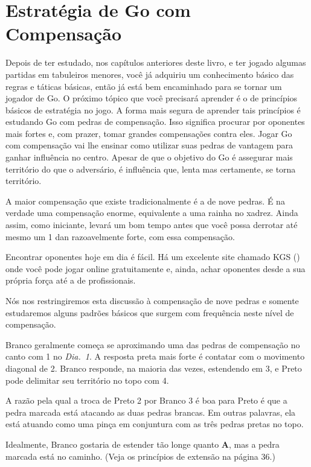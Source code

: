 \chapter{Estratégia de Go com Compensação}\label{chap:estrat_comp}

Depois de ter estudado, nos capítulos anteriores deste livro, e ter jogado algumas partidas em tabuleiros menores, você já adquiriu um conhecimento básico das regras e táticas básicas, então já está bem encaminhado para se tornar um jogador de Go. O próximo tópico que você precisará aprender é o de princípios básicos de estratégia no jogo. A forma mais segura de aprender tais princípios é estudando Go com pedras de compensação. Isso significa procurar por oponentes mais fortes e, com prazer, tomar grandes compensações contra eles. Jogar Go com compensação vai lhe ensinar como utilizar suas pedras de vantagem para ganhar influência no centro. Apesar de que o objetivo do Go é assegurar mais território do que o adversário, é influência que, lenta mas certamente, se torna território.

A maior compensação que existe tradicionalmente é a de nove pedras. É na verdade uma compensação enorme, equivalente a uma rainha no xadrez. Ainda assim, como iniciante, levará um bom tempo antes que você possa derrotar até mesmo um 1 dan razoavelmente forte, com essa compensação.

Encontrar oponentes hoje em dia é fácil. Há um excelente site chamado KGS (\href{https://www.gokgs.com}{})~\cite{kgs} onde você pode jogar online gratuitamente e, ainda, achar oponentes desde a sua própria força até a de profissionais.

Nós nos restringiremos esta discussão à compensação de nove pedras e somente estudaremos alguns padrões básicos que surgem com frequência neste nível de compensação.

\bigskip

Branco geralmente começa se aproximando uma das pedras de compensação no canto com 1 no \emph{Dia.\@~1}. A resposta preta mais forte é contatar com o movimento diagonal de 2. Branco responde, na maioria das vezes, estendendo em 3, e Preto pode delimitar seu território no topo com 4.

A razão pela qual a troca de Preto 2 por Branco 3 é boa para Preto é que a pedra marcada está atacando as duas pedras brancas. Em outras palavras, ela está atuando como uma pinça em conjuntura com as três pedras pretas no topo.

Idealmente, Branco gostaria de estender tão longe quanto \textbf{A}, mas a pedra marcada está no caminho. (Veja os princípios de extensão na página 36.)

